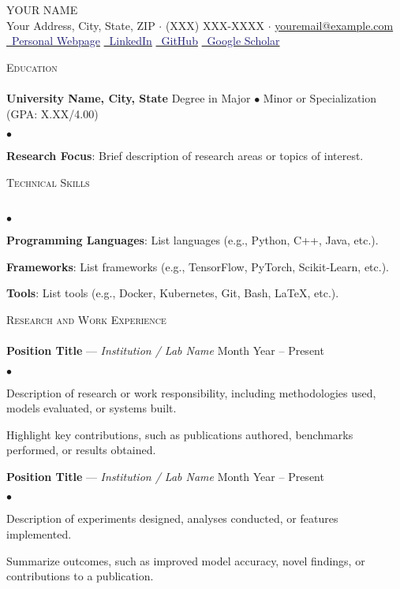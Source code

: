 \documentclass[10.5pt]{article}
\newcommand{\lineunder}{\vspace*{-8pt} \\ \hspace*{-18pt} \hrulefill \\}
\newcommand{\header}[1]{{\hspace*{-15pt}\vspace*{6pt} \textsc{#1}} \vspace*{-6pt} \lineunder}
\newcommand{\employer}[3]{{\textbf{#1} — \textit{#2} \hfill #3}}
\newcommand{\school}[4]{\textbf{#1} #2 #3 #4}
\newenvironment{achievements}
  {\begin{list}{$\bullet$}{\topsep 0pt \itemsep -2pt}}  
  {\end{list}}
\newcommand{\contact}[3]{%
  \begin{center}
    {\LARGE \scshape #1}\\[4pt]  %
    #2 \\[1pt]                  %
    #3                           %
  \end{center}
  \vspace*{-8pt}
}
\newcommand{\iconlink}[3][MidnightBlue]{%
  \href{#2}{\textcolor{#1}{#3}}%
}
\begin{document}
\normalsize
\smallskip
\vspace*{-44pt}

\contact{YOUR NAME}
{Your Address, City, State, ZIP $\cdot$ (XXX) XXX-XXXX $\cdot$ \href{mailto:youremail@example.com}{youremail@example.com}}
{%
  \iconlink{https://yourwebsite.example.com}{\faHome\ Personal Webpage} \quad
  \iconlink{https://www.linkedin.com/in/yourprofile}{\faLinkedin\ LinkedIn} \quad
  \iconlink{https://github.com/yourusername}{\faGithub\ GitHub} \quad
  \iconlink{https://scholar.google.com/yourprofile}{\faGraduationCap\ Google Scholar}
}

\header{Education}
\school{University Name, City, State}
{Degree in Major \hspace{1pt} $\bullet$ Minor or Specialization (GPA: X.XX/4.00)} \\
\begin{achievements}
    \item \textbf{Research Focus}: Brief description of research areas or topics of interest.
\end{achievements}

\header{Technical Skills}
\begin{achievements}
    \item \textbf{Programming Languages}: List languages (e.g., Python, C++, Java, etc.).
    \item \textbf{Frameworks}: List frameworks (e.g., TensorFlow, PyTorch, Scikit-Learn, etc.).
    \item \textbf{Tools}: List tools (e.g., Docker, Kubernetes, Git, Bash, \LaTeX{}, etc.).
\end{achievements}

\header{Research and Work Experience}
\employer{Position Title}{Institution / Lab Name}{Month Year – Present}
\begin{achievements}
    \item Description of research or work responsibility, including methodologies used, models evaluated, or systems built.
    \item Highlight key contributions, such as publications authored, benchmarks performed, or results obtained.
\end{achievements}

\employer{Position Title}{Institution / Lab Name}{Month Year – Present}
\begin{achievements}
    \item Description of experiments designed, analyses conducted, or features implemented.
    \item Summarize outcomes, such as improved model accuracy, novel findings, or contributions to a publication.
\end{achievements}
\end{document}
